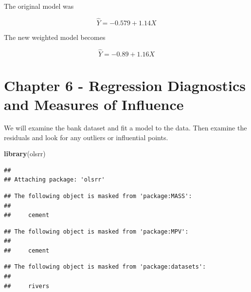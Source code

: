 \documentclass[
  11pt,
]{article}
\newenvironment{Shaded}{\begin{snugshade}}{\end{snugshade}}
\newcommand{\AttributeTok}[1]{\textcolor[rgb]{0.13,0.29,0.53}{#1}}
\newcommand{\CommentTok}[1]{\textcolor[rgb]{0.56,0.35,0.01}{\textit{#1}}}
\newcommand{\ConstantTok}[1]{\textcolor[rgb]{0.56,0.35,0.01}{#1}}
\newcommand{\FunctionTok}[1]{\textcolor[rgb]{0.13,0.29,0.53}{\textbf{#1}}}
\newcommand{\NormalTok}[1]{#1}
\newcommand{\OtherTok}[1]{\textcolor[rgb]{0.56,0.35,0.01}{#1}}
\newcommand{\SpecialCharTok}[1]{\textcolor[rgb]{0.81,0.36,0.00}{\textbf{#1}}}
\newcommand{\StringTok}[1]{\textcolor[rgb]{0.31,0.60,0.02}{#1}}
\begin{document}
The original model was

\[\hat{Y} = -0.579 + 1.14 X\]

The new weighted model becomes

\[\hat{Y} = -0.89 + 1.16 X\]

\section{Chapter 6 - Regression Diagnostics and Measures of
Influence}\label{chapter-6---regression-diagnostics-and-measures-of-influence}

We will examine the bank dataset and fit a model to the data. Then
examine the residuals and look for any outliers or influential points.

\begin{Shaded}
\begin{Highlighting}[]
\FunctionTok{library}\NormalTok{(olsrr)}
\end{Highlighting}
\end{Shaded}

\begin{verbatim}
## 
## Attaching package: 'olsrr'
\end{verbatim}

\begin{verbatim}
## The following object is masked from 'package:MASS':
## 
##     cement
\end{verbatim}

\begin{verbatim}
## The following object is masked from 'package:MPV':
## 
##     cement
\end{verbatim}

\begin{verbatim}
## The following object is masked from 'package:datasets':
## 
##     rivers
\end{verbatim}

\begin{Shaded}
\end{Shaded}
\end{document}
